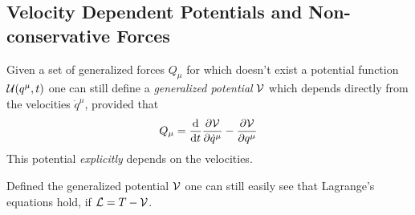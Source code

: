 \documentclass[../admech.tex]{subfiles}
\begin{document}
\subsection{Velocity Dependent Potentials and Non-conservative Forces}
\begin{dfn}
	Given a set of generalized forces $Q_\mu$ for which doesn't exist a potential function $\mathcal{U}(q^\mu,t)$ one can still define a \emph{generalized potential} $\mathcal{V}$ which depends directly from the velocities $\dot{q}^\mu$, provided that
	\begin{equation}
		Q_\mu=\dv{t}\pdv{\mathcal{V}}{\dot{q}^\mu}-\pdv{\mathcal{V}}{q^\mu}
		\label{eq:vpot}
	\end{equation}
	This potential \emph{explicitly} depends on the velocities.
\end{dfn}
Defined the generalized potential $\mathcal{V}$ one can still easily see that Lagrange's equations hold, if $\mathcal{L}=T-\mathcal{V}$.
\end{document}
